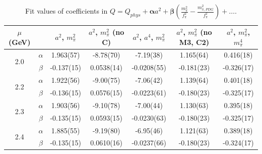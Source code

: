 \documentclass[12pt]{extarticle}
\begin{document}
\begin{table}[h!]
\begin{center}
\begin{tabular}{|c c|c|c|c|c|c|}
\hline
$\mu$ (GeV) &  & $a^2$, $m_\pi^2$& $a^2$, $m_\pi^2$ (no C)& $a^2$, $a^4$, $m_\pi^2$& $a^2$, $m_\pi^2$ (no M3, C2)& $a^2$, $m_\pi^2$, $m_\pi^4$\\
\hline
\multirow{2}{0.5in}{2.0} & $\alpha$ & 1.963(57)& -8.78(70)& -7.19(38)& 1.165(64)& 0.416(18)\\
 & $\beta$ & -0.137(15)& 0.0538(14)& -0.0208(55)& -0.181(23)& -0.326(17)\\
\hline
\multirow{2}{0.5in}{2.2} & $\alpha$ & 1.922(56)& -9.00(75)& -7.06(42)& 1.139(64)& 0.401(18)\\
 & $\beta$ & -0.136(15)& 0.0576(15)& -0.0223(61)& -0.180(23)& -0.325(17)\\
\hline
\multirow{2}{0.5in}{2.3} & $\alpha$ & 1.903(56)& -9.10(78)& -7.00(44)& 1.130(63)& 0.395(18)\\
 & $\beta$ & -0.135(15)& 0.0593(15)& -0.0230(63)& -0.180(23)& -0.325(17)\\
\hline
\multirow{2}{0.5in}{2.4} & $\alpha$ & 1.885(55)& -9.19(80)& -6.95(46)& 1.121(63)& 0.389(18)\\
 & $\beta$ & -0.135(15)& 0.0610(16)& -0.0237(66)& -0.180(23)& -0.324(17)\\
\hline
\end{tabular}
\caption{Fit values of coefficients in $Q = Q_{phys} + \mathbf{\alpha} a^2 + \mathbf{\beta}\left(\frac{m_\pi^2}{f_\pi^2}-\frac{m_{\pi,PDG}^2}{f_\pi^2}\right) + \ldots$.}
\end{center}
\end{table}




















\clearpage
\end{document}
